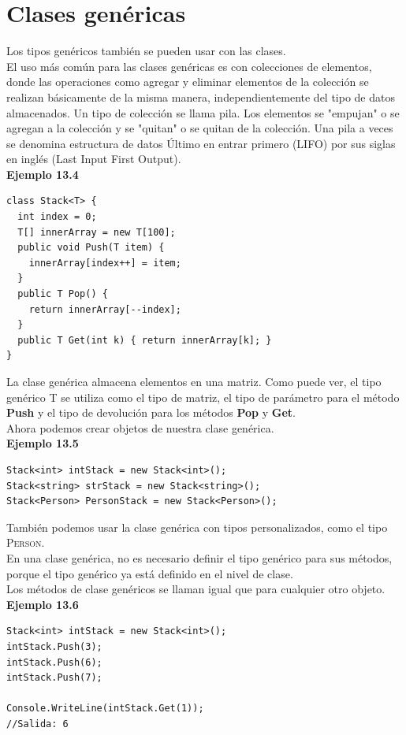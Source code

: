 \documentclass[12pt,a4paper]{report}
\begin{document}
\section{Clases genéricas}
Los tipos genéricos también se pueden usar con las clases.\\El uso más común para las clases genéricas es con colecciones de elementos, donde las operaciones como agregar y eliminar elementos de la colección se realizan básicamente de la misma manera, independientemente del tipo de datos almacenados. Un tipo de colección se llama pila. Los elementos se "empujan" o se agregan a la colección y se "quitan" o se quitan de la colección. Una pila a veces se denomina estructura de datos Último en entrar primero (LIFO) por sus siglas en inglés (Last Input First Output).\\\textbf{Ejemplo 13.4}
\begin{lstlisting}
class Stack<T> {
  int index = 0;
  T[] innerArray = new T[100];
  public void Push(T item) {
    innerArray[index++] = item; 
  }
  public T Pop() {
    return innerArray[--index]; 
  }
  public T Get(int k) { return innerArray[k]; }
}
\end{lstlisting}La clase genérica almacena elementos en una matriz. Como puede ver, el tipo genérico T se utiliza como el tipo de matriz, el tipo de parámetro para el método\textbf{ Push} y el tipo de devolución para los métodos\textbf{ Pop} y\textbf{ Get}.\\Ahora podemos crear objetos de nuestra clase genérica.\\\textbf{Ejemplo 13.5}
\begin{lstlisting}
Stack<int> intStack = new Stack<int>();
Stack<string> strStack = new Stack<string>();
Stack<Person> PersonStack = new Stack<Person>();
\end{lstlisting}También podemos usar la clase genérica con tipos personalizados, como el tipo\textsc{ Person}.\\En una clase genérica, no es necesario definir el tipo genérico para sus métodos, porque el tipo genérico ya está definido en el nivel de clase.\\Los métodos de clase genéricos se llaman igual que para cualquier otro objeto.\\\textbf{Ejemplo 13.6}
\begin{lstlisting}
Stack<int> intStack = new Stack<int>();
intStack.Push(3);
intStack.Push(6);
intStack.Push(7);
            
Console.WriteLine(intStack.Get(1));
//Salida: 6
\end{lstlisting}
\end{document}
